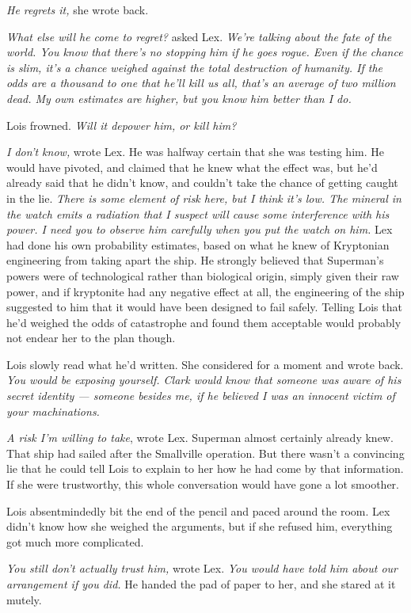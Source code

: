 \emph{He regrets it,} she wrote back.

\emph{What else will he come to regret?} asked Lex. \emph{We're talking
about the fate of the world. You know that there's no stopping him if he
goes rogue. Even if the chance is slim, it's a chance weighed against
the total destruction of humanity. If the odds are a thousand to one
that he'll kill us all, that's an average of two million dead. My own
estimates are higher, but you know him better than I do.}

Lois frowned. \emph{Will it depower him, or kill him?}

\emph{I don't know,} wrote Lex. He was halfway certain that she was
testing him. He would have pivoted, and claimed that he knew what the
effect was, but he'd already said that he didn't know, and couldn't take
the chance of getting caught in the lie. \emph{There is some element of
risk here, but I think it's low. The mineral in the watch emits a
radiation that I suspect will cause some interference with his power. I
need you to observe him carefully when you put the watch on him.} Lex
had done his own probability estimates, based on what he knew of
Kryptonian engineering from taking apart the ship. He strongly believed
that Superman's powers were of technological rather than biological
origin, simply given their raw power, and if kryptonite had any negative
effect at all, the engineering of the ship suggested to him that it
would have been designed to fail safely. Telling Lois that he'd weighed
the odds of catastrophe and found them acceptable would probably not
endear her to the plan though.

Lois slowly read what he'd written. She considered for a moment and
wrote back. \emph{You would be exposing yourself. Clark would know that
someone was aware of his secret identity --- someone besides me, if he
believed I was an innocent victim of your machinations.}

\emph{A risk I'm willing to take}, wrote Lex. Superman almost certainly
already knew. That ship had sailed after the Smallville operation. But
there wasn't a convincing lie that he could tell Lois to explain to her
how he had come by that information. If she were trustworthy, this whole
conversation would have gone a lot smoother.

Lois absentmindedly bit the end of the pencil and paced around the room.
Lex didn't know how she weighed the arguments, but if she refused him,
everything got much more complicated.

\emph{You still don't actually trust him,} wrote Lex. \emph{You would
have told him about our arrangement if you did.} He handed the pad of
paper to her, and she stared at it mutely.


